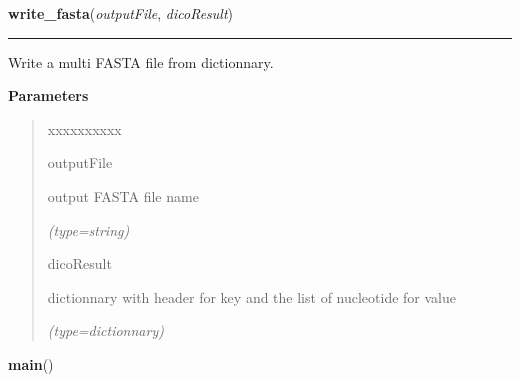     \label{script-VCFtoFASTA:write_fasta}

    \vspace{0.5ex}

\hspace{.8\funcindent}\begin{boxedminipage}{\funcwidth}

    \raggedright \textbf{write\_fasta}(\textit{outputFile}, \textit{dicoResult})

    \vspace{-1.5ex}

    \rule{\textwidth}{0.5\fboxrule}
\setlength{\parskip}{2ex}
    Write a multi FASTA file from dictionnary.

\setlength{\parskip}{1ex}
      \textbf{Parameters}
      \vspace{-1ex}

      \begin{quote}
        \begin{Ventry}{xxxxxxxxxx}

          \item[outputFile]

          output FASTA file name

            {\it (type=string)}

          \item[dicoResult]

          dictionnary with header for key and the list of nucleotide for 
          value

            {\it (type=dictionnary)}

        \end{Ventry}

      \end{quote}

    \end{boxedminipage}

    \label{script-VCFtoFASTA:main}

    \vspace{0.5ex}

\hspace{.8\funcindent}\begin{boxedminipage}{\funcwidth}

    \raggedright \textbf{main}()

\setlength{\parskip}{2ex}
\setlength{\parskip}{1ex}
    \end{boxedminipage}


